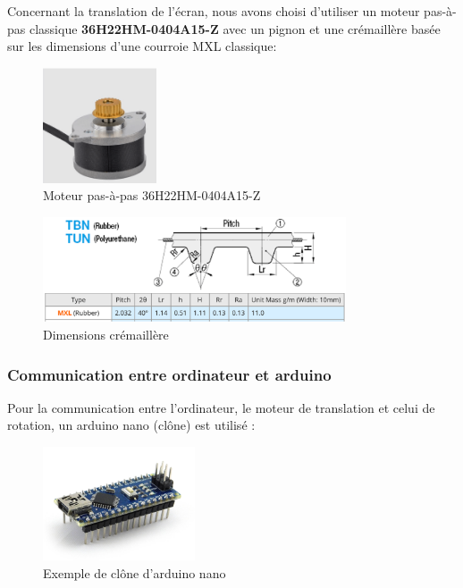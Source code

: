 Concernant la translation de l'écran, nous avons choisi d'utiliser un moteur pas-à-pas classique \textbf{36H22HM-0404A15-Z} avec un pignon et une crémaillère basée sur les
dimensions d'une courroie MXL classique\cite{dimensions_courroies_mxl}\footnotemark :
\begin{figure}[H]
    \centering
    \includegraphics[width=0.3\textwidth]{assets/figures/ameliorations/36H22HM-0404A15-Z.png}
    \caption[Moteur 36H22HM-0404A15-Z]{Moteur pas-à-pas 36H22HM-0404A15-Z\autocite{moteur_translation_site}\footnotemark}
\end{figure}

\begin{figure}[H]
    \centering
    \includegraphics[width=0.8\textwidth]{assets/figures/ameliorations/dimensions_cremaillere.png}
    \caption[Dimensions crémaillère]{Dimensions crémaillère\autocite{dimensions_courroies_mxl}}
\end{figure}




\subsubsection{Communication entre ordinateur et arduino}\label{sec:comm_ordi_arduino}

Pour la communication entre l'ordinateur, le moteur de translation et celui de rotation, un arduino nano (clône) est utilisé :
\begin{figure}[H]
    \centering
    \includegraphics[width = 0.4\textwidth]{assets/figures/ameliorations/arduino_nano.jpg}
    \caption[Exemple de clône d'arduino nano]{Exemple de clône d'arduino nano \autocite{clone_nano}}
\end{figure}


